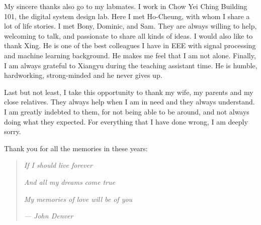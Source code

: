 \begin{acknowledgements}
My sincere thanks also go to my labmates. I work in Chow Yei Ching Building 101, the digital system design lab. Here I met Ho-Cheung, with whom I share a lot of life stories. I met Bony, Dominic, and Sam. They are always willing to help, welcoming to talk, and passionate to share all kinds of ideas. I would also like to thank Xing. He is one of the best colleagues I have in EEE with signal processing and machine learning background. He makes me feel that I am not alone. Finally, I am always grateful to Xiangyu during the teaching assistant time. He is humble, hardworking, strong-minded and he never gives up.

Last but not least, I take this opportunity to thank my wife, my parents and my close relatives. They always help when I am in need and they always understand. I am greatly indebted to them, for not being able to be around, and not always doing what they expected. For everything that I have done wrong, I am deeply sorry.

\newpage
Thank you for all the memories in these years:
\begin{quote}
\centering
\textit{If I should live forever}

\textit{And all my dreams come true}

\textit{My memories of love will be of you}

\textit{--- John Denver}
\end{quote}

\end{acknowledgements}




